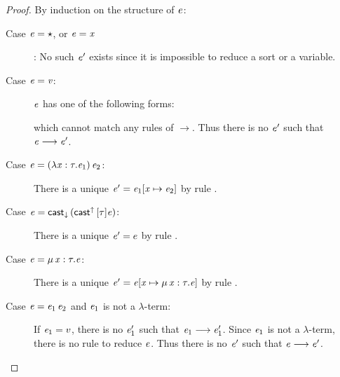 \begin{proof}
	By induction on the structure of $\mathit{e}$:
	\begin{description}
	    \item[Case $\mathit{e}  =  \star$, or $\mathit{e}  =  \mathit{x}$]: No such $\mathit{e'}$ exists since it is impossible to reduce a sort or a variable.
		\item[Case $\mathit{e}  =  \mathit{v}$:] $\mathit{e}$ has one of the following forms:
		\begin{inparaenum}[(1)]
			\item $\lambda  \ottmv{x}  \ottsym{:}  \tau  \ottsym{.}  \ottnt{e}$,
			\item $\Pi \, \ottmv{x}  \ottsym{:}  \tau_{{\mathrm{1}}}  \ottsym{.}  \tau_{{\mathrm{2}}}$,
			\item $\kw{cast}^{\uparrow} \, \ottsym{[}  \tau  \ottsym{]}  \ottnt{e}$,
		\end{inparaenum}
		which cannot match any rules of $ \longrightarrow $. Thus there is no $\mathit{e}'$ such that $\mathit{e}  \longrightarrow  \mathit{e'}$.
		\item[Case $\mathit{e}=(  \lambda  \mathit{x}  :  \tau  .  \mathit{e_{{\mathrm{1}}}}  ) \, \mathit{e_{{\mathrm{2}}}}$:] There is a unique $\mathit{e}'=\mathit{e_{{\mathrm{1}}}}  [  \mathit{x}  \mapsto  \mathit{e_{{\mathrm{2}}}}  ]$ by rule .
		\item[Case $\mathit{e}=\mathsf{cast}_{\downarrow} \, (  \mathsf{cast}^{\uparrow} \, [  \tau  ]  \mathit{e}  )$:] There is a unique $\mathit{e}'=e$ by rule .
		\item[Case $\mathit{e}=\mu \, \mathit{x}  :  \tau  .  \mathit{e}$:] There is a unique $\mathit{e}'=\mathit{e}  [  \mathit{x}  \mapsto  \mu \, \mathit{x}  :  \tau  .  \mathit{e}  ]$ by rule .
		\item[Case $\mathit{e}=\mathit{e_{{\mathrm{1}}}} \, \mathit{e_{{\mathrm{2}}}}$ and $\mathit{e_{{\mathrm{1}}}}$ is not a $\lambda$-term:] If $\mathit{e_{{\mathrm{1}}}}=v$, there is no $\mathit{e'_{{\mathrm{1}}}}$ such that $\mathit{e_{{\mathrm{1}}}}  \longrightarrow  \mathit{e'_{{\mathrm{1}}}}$. Since $\mathit{e_{{\mathrm{1}}}}$ is not a $\lambda$-term, there is no rule to reduce $\mathit{e}$. Thus there is no $\mathit{e}'$ such that $\mathit{e}  \longrightarrow  \mathit{e'}$.
		

\end{description}
\end{proof}

